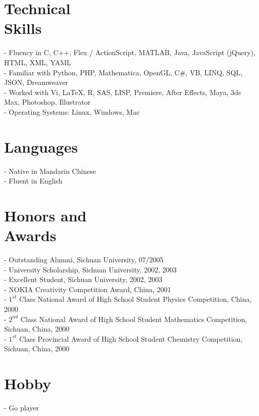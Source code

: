 \documentclass[margin,line]{resume}
\begin{document}
\begin{resume}
    \section{\mysidestyle Technical \\ Skills} 
      
      - Fluency in C, C++, Flex / ActionScript, MATLAB, Java, JavaScript (jQuery), HTML, XML, YAML \\
      - Familiar with Python, PHP, Mathematica, OpenGL, C\#, VB, LINQ, SQL, JSON, Dreamweaver \\
      - Worked with Vi, \LaTeX, R, SAS, LISP, Premiere, After Effects, Maya, 3ds Max, Photoshop, Illustrator \\
      - Operating Systems: Linux, Windows, Mac       
      

    \section{\mysidestyle Languages}
      
      - Native in Mandarin Chinese \\
      - Fluent in English 
      

      
    \section{\mysidestyle Honors and \\ Awards} 
      
      - Outstanding Alumni, Sichuan University, 07/2005 \\
      - University Scholarship, Sichuan University, 2002, 2003 \\
      - Excellent Student, Sichuan University, 2002, 2003 \\
      - NOKIA Creativity Competition Award, China, 2001 \\
      - $1^{st}$ Class National Award of High School Student Physics Competition, China, 2000 \\
      - $2^{nd}$ Class National Award of High School Student Mathematics Competition, Sichuan, China, 2000 \\
      - $1^{st}$ Class Provincial Award of High School Student Chemistry Competition, Sichuan, China, 2000       
      

    \section{\mysidestyle Hobby} 
      
	- Go player
      

\end{resume}
\end{document}

